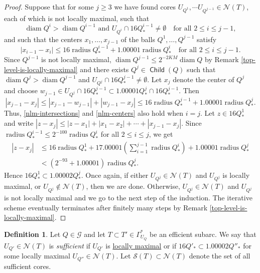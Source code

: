 \documentclass[12pt]{amsart}
\numberwithin{equation}{section}
\theoremstyle{plain}
\theoremstyle{definition}
\newtheorem{definition}[theorem]{Definition}
\newcommand{\radius}{\mathop\mathrm{radius}\nolimits}
\newcommand{\diam}{\mathop\mathrm{diam}\nolimits}
\newcommand{\Child}{\mathop\mathsf{Child}\nolimits}
\numberwithin{figure}{section}
\begin{document}
\begin{proof}
Suppose that for some $j\geq 3$ we have found cores $U_{Q^1},\cdots U_{Q^{j-1}}\in\mathcal{N}(T)$, each of which is not locally maximal, such that \begin{equation}\label{nlm-intersections}\diam Q^i>\diam Q^{i-1}\text{ and }U_{Q^i}\cap 16Q^{i-1}_*\neq\emptyset\quad\text{for all }2 \leq i\leq j-1,\end{equation} and such that the centers $x_1,\dots,x_{j-1}$ of the balls $Q^1,\dots,Q^{j-1}$ satisfy \begin{equation}\label{nlm-centers} |x_{i-1}-x_i| \leq 16\radius Q^{i-1}_* + 1.00001\radius Q^i_*\quad\text{for all }2\leq i\leq j-1.\end{equation} Since $Q^{j-1}$ is not locally maximal, $\diam Q^{j-1}\leq 2^{-2KM}\diam Q$ by Remark \ref{top-level-is-locally-maximal} and there exists $Q^j\in\Child(Q)$ such that $\diam Q^j>\diam Q^{j-1}$ and $U_{Q^j}\cap 16Q^{j-1}_*\neq\emptyset$. Let $x_j$ denote the center of $Q^j$ and choose $w_{j-1}\in U_{Q^j}\cap 16Q^{j-1}_*\subset 1.00001Q^j_*\cap 16Q^{j-1}_*$. Then \begin{equation}\label{nlmj} |x_{j-1}-x_j| \leq |x_{j-1}-w_{j-1}|+|w_{j-1}-x_j| \leq 16\radius Q^{j-1}_*+1.00001\radius Q^j_*.\end{equation} Thus, \eqref{nlm-intersections} and \eqref{nlm-centers} also hold when $i=j$. Let $z\in 16Q^1_*$ and write $|z-x_j|\leq |z-x_1|+|x_1-x_2|+\cdots+|x_{j-1}-x_j|$. Since $\radius Q^{i-1}_*\leq 2^{-100}\radius Q^i_*$ for all $2\leq i\leq j$, we get \begin{equation}\begin{split}\label{nlm-telescope} |z-x_j| &\leq 16\radius Q^1_*+17.00001\left(\sum_{i=1}^{j-1} \radius Q^i_*\right)+1.00001\radius Q^j_*\\ &<(2^{-93}+1.00001)\radius Q^j_*.\end{split}\end{equation} Hence $16Q^1_*\subset 1.00002Q^j_*$. Once again, if either $U_{Q^j}\in\mathcal{N}(T)$ and $U_{Q^j}$ is locally maximal, or $U_{Q^j}\not\in\mathcal{N}(T)$, then we are done. Otherwise, $U_{Q^j}\in\mathcal{N}(T)$ and $U_{Q^j}$ is not locally maximal and we go to the next step of the induction. The iterative scheme eventually terminates after finitely many steps by Remark \ref{top-level-is-locally-maximal}.
\end{proof}

\begin{definition}\label{def:sufficient} Let $Q\in\mathscr{G}$ and let $T\subset T'\in\Gamma^*_{U_Q}$ be an efficient subarc. We say that  $U_{Q'}\in\mathcal{N}(T)$ is \emph{sufficient} if $U_{Q'}$ is \hyperref[def:locally-maximal]{locally maximal} or if $16Q'_*\subset 1.00002Q''_*$ for some locally maximal $U_{Q''}\in\mathcal{N}(T)$. Let $\mathcal{S}(T)\subset\mathcal{N}(T)$ denote the set of all sufficient cores. \end{definition}
\end{document}
